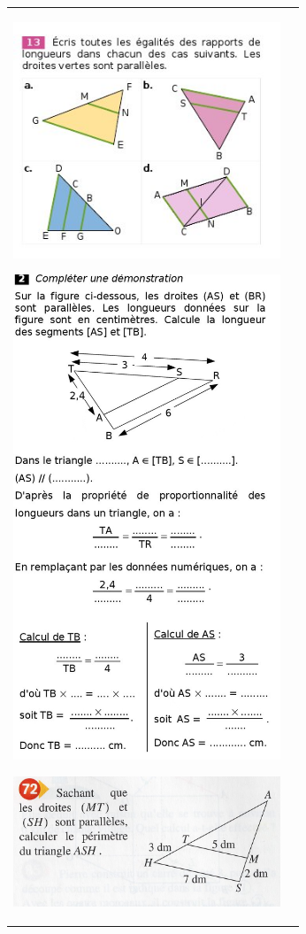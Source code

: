 \documentclass[12pt, twoside]{article}
\begin{document}
\begin{tabular}{cc}
\begin{minipage}{9cm}
\includegraphics[width=8cm]{images/ex13.jpg}

\enskip

\includegraphics[width=8cm]{images/ex2.jpg}

\enskip

\includegraphics[width=8cm]{images/ex72.jpg}


\end{minipage}
\end{tabular}
\end{document}
